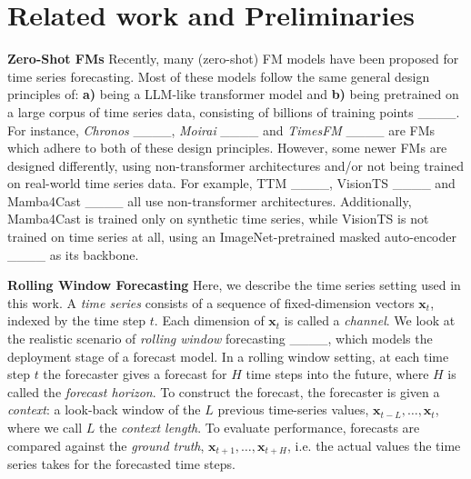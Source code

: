\section{Related work and Preliminaries}
\label{sec:preliminaries}
\textbf{Zero-Shot FMs} \; Recently, many (zero-shot) FM models have been proposed for time series forecasting. Most of these models follow the same general design principles of: \textbf{a)} being a LLM-like transformer model and \textbf{b)} being pretrained on a large corpus of time series data, consisting of billions of training points ____. For instance, \textit{Chronos} ____, \textit{Moirai} ____ and \textit{TimesFM} ____ are FMs which adhere to both of these design principles. However, some newer FMs are designed differently, using non-transformer architectures and/or not being trained on real-world time series data. For example, TTM ____, VisionTS ____ and Mamba4Cast ____ all use non-transformer architectures. Additionally, Mamba4Cast is trained only on synthetic time series, while VisionTS is not trained on time series at all, using an ImageNet-pretrained masked auto-encoder ____ as its backbone. 

\textbf{Rolling Window Forecasting} \; Here, we describe the time series setting used in this work. A \emph{time series} consists of a sequence of fixed-dimension vectors $\bm{x}_t$, indexed by the time step $t$. Each dimension of $\bm{x}_t$ is called a \emph{channel}. We look at the realistic scenario of \textit{rolling window} forecasting ____, which models the deployment stage of a forecast model. In a rolling window setting, at each time step $t$ the forecaster gives a forecast for $H$ time steps into the future, where $H$ is called the \emph{forecast horizon}. To construct the forecast, the forecaster is given a \emph{context}: a look-back window of the $L$ previous time-series values, $\bm{x}_{t-L}, \ldots, \bm{x}_t$, where we call $L$ the \emph{context length}. To evaluate performance, forecasts are compared against the \emph{ground truth}, $\bm{x}_{t+1}, \ldots, \bm{x}_{t+H}$, i.e. the actual values the time series takes for the forecasted time steps.